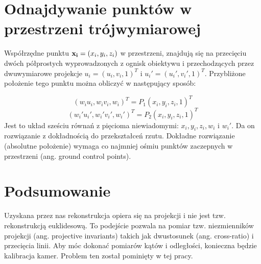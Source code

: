 \section{Odnajdywanie punktów w przestrzeni trójwymiarowej}

Współrzędne punktu ${\bf x_i} = (x_i, y_i, z_i) $ w przestrzeni, znajdują się
na przecięciu dwóch półprostych wyprowadzonych z ognisk obiektywu i
przechodzących przez dwuwymiarowe projekcje $u_i = (u_i, v_i, 1)^T$ i
$u_i\prime = (u_i\prime, v_i\prime, 1)^T$. Przybliżone położenie tego punktu
można obliczyć w następujący sposób: 

\begin{equation} (w_i u_i, w_i v_i, w_i)^T = P_1(x_i, y_i, z_i, 1)^T
\end{equation} \begin{equation} (w_i\prime u_i\prime, w_i\prime v_i\prime,
  w_i\prime)^T = P_2(x_i, y_i, z_i, 1)^T \end{equation} Jest to układ sześciu
  równań z pięcioma niewiadomymi: $x_i, y_i, z_i, w_i$ i $w_i\prime$. Da on
  rozwiązanie z dokładnością do przekształceń rzutu.  Dokładne rozwiązanie
  (absolutne położenie) wymaga co najmniej ośmiu punktów zaczepnych w
  przestrzeni (ang. ground control points).

\section{Podsumowanie}

Uzyskana przez nas rekonstrukcja opiera się na projekcji i nie jest tzw.
rekonstrukcją euklidesową. To podejście pozwala na pomiar tzw. niezmienników
projekcji (ang. projective invariants) takich jak dwustosunek (ang.
cross-ratio) i przecięcia linii. Aby móc dokonać pomiarów kątów i odległości,
konieczna będzie kalibracja kamer. Problem ten został pominięty w tej pracy.
